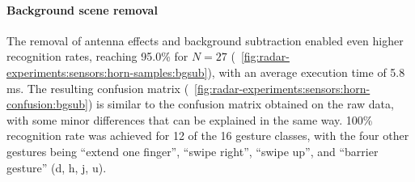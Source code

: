 \paragraph{Background scene removal}
The removal of antenna effects and background subtraction enabled even higher recognition rates, reaching 95.0\% for $N{=}27$ (\fig~\ref{fig:radar-experiments:sensors:horn-samples:bgsub}), with an average execution time of 5.8 ms. The resulting confusion matrix (\fig~\ref{fig:radar-experiments:sensors:horn-confusion:bgsub}) is similar to the confusion matrix obtained on the raw data, with some minor differences that can be explained in the same way. 100\% recognition rate was achieved for 12 of the 16 gesture classes, with the four other gestures being ``extend one finger'', ``swipe right'', ``swipe up'', and ``barrier gesture'' (d, h, j, u).

